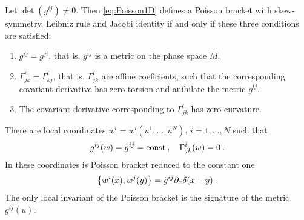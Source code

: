 \begin{theorem} \label{theorem1:ekvivalence}
    Let $\det(g^{ij}) \neq 0$. Then \eqref{eq:Poisson1D} defines a Poisson bracket with skew-symmetry, Leibniz rule and Jacobi identity if and only if these three conditions are satisfied:
    \begin{enumerate}
        \item $g^{ij} = g^{ji}$, that is, $g^{ij}$ is a metric on the phase space $M$.
        \item $\Gamma^{i}_{jk} = \Gamma^i_{kj}$, that is, $\Gamma^{i}_{jk}$ are affine coeficients, such that the corresponding covariant derivative has zero torsion and anihilate the metric $g^{ij}$.
        \item The covariant derivative corresponding to $\Gamma^{i}_{jk}$ has zero curvature.
    \end{enumerate}
\end{theorem}

\begin{corollary}
    There are local coordinates $w^i = w^i(u^1, \dots, u^N)$, $i = 1, \dots, N$ such that
    \begin{align}
        g^{ij}(w) = \tilde g^{ij} = \mathrm{const} \:, \quad \Gamma^i_{jk} (w) = 0 \:.
    \end{align}
    In these coordinates is Poisson bracket reduced to the constant one
    \begin{align}
        \left \lbrace w^i(x),w^j(y) \right \rbrace = \tilde{g}^{ij} \partial_x \delta(x-y) \:.
    \end{align}
    The only local invariant of the Poisson bracket is the signature of the metric $g^{ij}(u)$.
\end{corollary}

